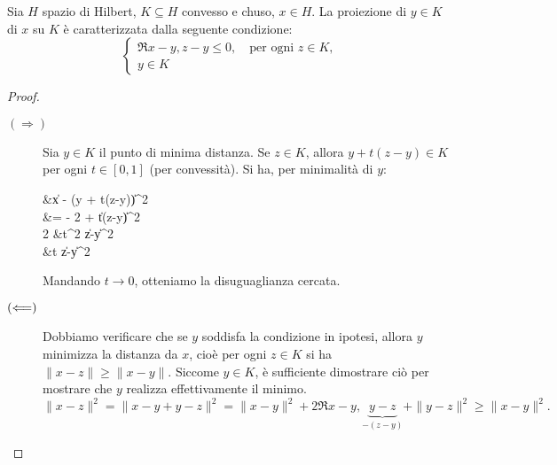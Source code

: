 \begin{lemma}
\label{lemma:hilb_proj}
	Sia $H$ spazio di Hilbert, $K \subseteq H$ convesso e chuso, $x \in H$.
	La proiezione di $y \in K$ di $x$ su $K$ è caratterizzata dalla seguente condizione:
	\begin{equation*}
		\begin{cases}
			\Re{x-y, z-y} \leq 0, \quad \text{per ogni $z \in K$},\\
			y \in K
		\end{cases}
	\end{equation*}
\end{lemma}
\begin{proof}
	\leavevmode
	\begin{description}
		\item[$(\Longrightarrow)$] Sia $y \in K$ il punto di minima distanza. Se $z \in K$, allora $y + t(z-y) \in K$ per ogni $t \in [0,1]$ (per convessità). Si ha, per minimalità di $y$:
		\begin{eqalign*}
			 &\leq \|x - (y + t(z-y))\|^2\\
			&=  - 2 + \|t(z-y)\|^2\\[1ex]
			2 &\leq t^2 \|z-y\|^2\\[1ex]
			 &\leq t \|z-y\|^2
		\end{eqalign*}
		Mandando $t \to 0$, otteniamo la disuguaglianza cercata.

		\item[$(\Longleftarrow)$] Dobbiamo verificare che se $y$ soddisfa la condizione in ipotesi, allora $y$ minimizza la distanza da $x$, cioè per ogni $z \in K$ si ha $\|x-z\| \geq \|x-y\|$. Siccome $y \in K$, è sufficiente dimostrare ciò per mostrare che $y$ realizza effettivamente il minimo.
		\begin{equation*}
			\|x-z\|^2  = \|x-y+y-z\|^2 = \|x-y\|^2 + 2\Re{x-y,\underbrace{y-z}_{-(z-y)}} + \|y-z\|^2 \geq \|x-y\|^2.
		\end{equation*}
	\end{description}
\end{proof}

